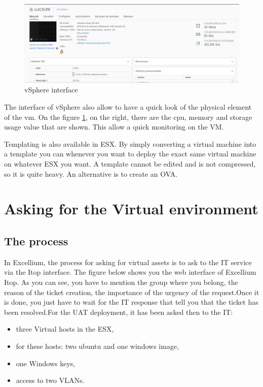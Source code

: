 \documentclass{tnreport}
\begin{document}
\begin{figure}[h!]
  \begin{center}
  \includegraphics[width=\linewidth]{figures/esx}
  \caption{vSphere interface}
  \label{fig:esx}
  \end{center}
\end{figure}


The interface of vSphere also allow to have a quick look of the physical element of the vm. On the figure \ref{fig:esx}, on the right, there are the cpu, memory and storage usage value that are shown. This allow a quick monitoring on the VM.


Templating is also available in ESX. By simply converting a virtual machine into a template you can whenever you want to deploy the exact same virtual machine on whatever ESX you want. A template cannot be edited and is not compressed, so it is quite heavy. An alternative is to create an OVA. 


\section{Asking for the Virtual environment}
\subsection{The process}
In \gls{Excellium}, the process for asking for virtual assets is to ask to the IT service via the Itop interface. The figure below shows you the web interface of \gls{Excellium} Itop. As you can see, you have to mention the group where you belong, the reason of the ticket creation, the importance of the urgency of the request.\eol Once it is done, you just have to wait for the IT response that tell you that the ticket has been resolved.\eol For the \gls{UAT} deployment, it has been asked then to the IT: 

\begin{itemize}
    \item three Virtual hosts in the ESX,
    \item for these hosts: two ubuntu and one windows image,
    \item one Windows keys,
    \item access to two VLANs.
\end{itemize}
\end{document}
